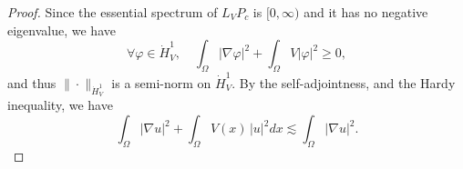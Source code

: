 \documentclass[10pt,leqno]{amsart}
\DeclareMathOperator{\re}{Re} %
\theoremstyle{definition}%
\theoremstyle{remark}
\numberwithin{equation}{section}
\renewcommand{\^}{\widehat}%
\begin{document}
\begin{proof}
	Since the essential spectrum of $L_VP_c$ is $[0,\infty)$ and it has no negative eigenvalue, we have 
	\begin{equation}
	\label{seminorm}
	\forall \varphi\in \dot{H}^1_V,\quad
	\int_{\Omega} |\nabla \varphi|^2+\int_{\Omega} V |\varphi|^2\geq 0,
	\end{equation} 
	and thus $\|\cdot\|_{\dot{H}^1_V}$ is a semi-norm on $\dot{H}^1_V$.
	By the self-adjointness, and the Hardy inequality, we have
	\begin{equation}
	\label{eq:equi_en1}
	\int_{\Omega} |\nabla u|^2+\int_{\Omega} V(x)
	\,\lvert u \rvert^2dx
 \lesssim \int_{\Omega} |\nabla u|^2.
	\end{equation}
	

\end{proof}
\end{document}
